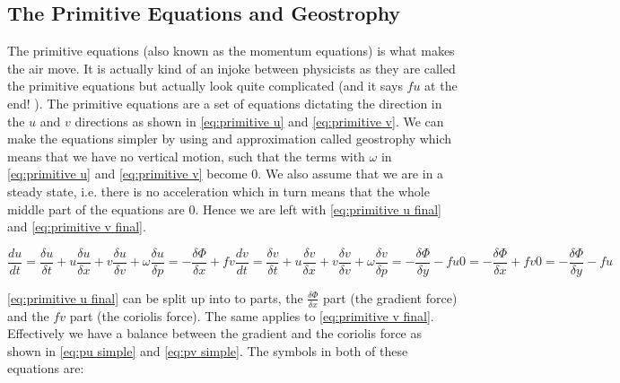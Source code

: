 \subsection{The Primitive Equations and Geostrophy}
The primitive equations (also known as the momentum equations) is what makes the air move. It is actually kind of an injoke between physicists as they are called the primitive equations but 
actually look quite complicated (and it says $fu$ at the end! \cite{simon}). The primitive equations are a set of equations dictating the direction in the $u$ and $v$ directions as shown in 
\autoref{eq:primitive u} and \autoref{eq:primitive v}. We can make the equations simpler by using and approximation called geostrophy which means that we have no vertical motion, such that the
terms with $\omega$ in \autoref{eq:primitive u} and \autoref{eq:primitive v} become 0. We also assume that we are in a steady state, i.e. there is no acceleration which in turn means that the 
whole middle part of the equations are $0$. Hence we are left with \autoref{eq:primitive u final} and \autoref{eq:primitive v final}.

\begin{subequations}
    \begin{equation}
        \frac{du}{dt} = \frac{\delta u}{\delta t} + u\frac{\delta u}{ \delta x} + v\frac{\delta u}{\delta v} + \omega\frac{\delta u}{\delta p} = -\frac{\delta \Phi}{\delta x} + fv
        \label{eq:primitive u}
    \end{equation}
    \begin{equation}
        \frac{dv}{dt} = \frac{\delta v}{\delta t} + u\frac{\delta v}{ \delta x} + v\frac{\delta v}{\delta v} + \omega\frac{\delta v}{\delta p} = -\frac{\delta \Phi}{\delta y} - fu
        \label{eq:primitive v}
    \end{equation}

    \begin{equation}
        0 = -\frac{\delta \Phi}{\delta x} + fv
        \label{eq:primitive u final}
    \end{equation}
    \begin{equation}
        0 = -\frac{\delta \Phi}{\delta y} - fu
        \label{eq:primitive v final}
    \end{equation}
\end{subequations}

\autoref{eq:primitive u final} can be split up into to parts, the $\frac{\delta \Phi}{\delta x}$ part (the gradient force) and the $fv$ part (the coriolis force). The same applies to 
\autoref{eq:primitive v final}. Effectively we have a balance between the gradient and the coriolis force as shown in \autoref{eq:pu simple} and \autoref{eq:pv simple}. The symbols in both of 
these equations are:

